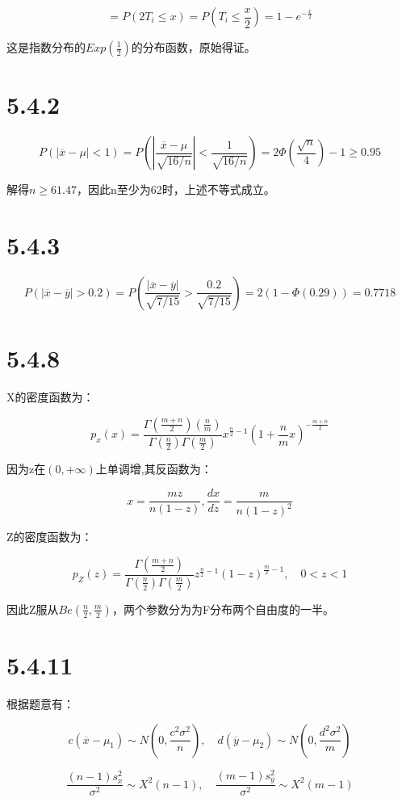 \documentclass{article}
\begin{document}
$$=P(2T_i\leq x)=P(T_i \leq \frac x2)=1-e^{-\frac x2}$$

这是指数分布的$Exp(\frac12)$的分布函数，原始得证。


\section{5.4.2}

$$P(|\overline{x}-\mu|<1)=P(|\frac{\overline{x}-\mu}{\sqrt{16/n}}|<\frac{1}{\sqrt{16/n}})=2\Phi(\frac{\sqrt{n}}{4})-1\geq 0.95$$

解得$n\geq61.47$，因此n至少为62时，上述不等式成立。

\section{5.4.3}

$$P(|\overline{x}-\overline{y}|>0.2)=P(\frac{|\overline{x}-\overline{y}|}{\sqrt{7/15}}>\frac{0.2}{\sqrt{7/15}})=2(1-\Phi(0.29))=0.7718$$

\section{5.4.8}

X的密度函数为：

$$p_x(x)=\frac{\Gamma(\frac{m+n}{2})(\frac nm)}{\Gamma(\frac n2)\Gamma(\frac m2)}x^{\frac n2 -1}(1+\frac nm x)^{-\frac{m+n}2}$$

因为z在$(0,+\infty)$上单调增,其反函数为：

$$x=\frac{mz}{n(1-z)},\frac{dx}{dz}=\frac m{n(1-z)^2}$$

Z的密度函数为：

$$p_Z(z)=\frac{\Gamma(\frac{m+n}2)}{\Gamma(\frac n2)\Gamma(\frac m2)}z^{\frac n2-1}(1-z)^{\frac m2-1}, \quad 0<z<1$$

因此Z服从$Be(\frac n2, \frac m2)$，两个参数分为为F分布两个自由度的一半。



\section{5.4.11}

根据题意有：

$$c(\overline x-\mu_1)\sim N(0, \frac{c^2\sigma^2}{n}),\quad d(\overline y -\mu_2)\sim N(0, \frac{d^2\sigma^2}{m})$$

$$\frac{(n-1)s_x^2}{\sigma^2}\sim X^2(n-1), \quad \frac{(m-1)s_y^2}{\sigma^2}\sim X^2(m-1)$$
\end{document}
